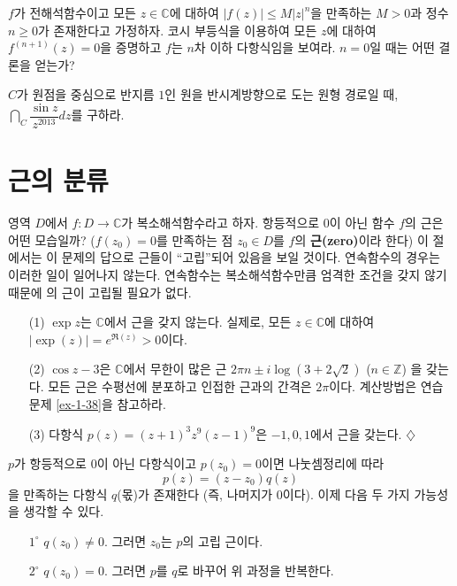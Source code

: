 \begin{salt_exercise} \label{ex-4-15}
$f$가 전해석함수이고 모든 $z\in\mathbb C$에 대하여
$|f(z)| \le M|z|^n$을 만족하는  $M>0$과 정수 $n\ge0$가 존재한다고 가정하자.
코시 부등식을 이용하여 모든 $z$에 대하여 $f^{(n+1)}(z) = 0$을 증명하고
$f$는 $n$차 이하 다항식임을 보여라. $n=0$일 때는 어떤 결론을 얻는가?
\end{salt_exercise}

\begin{salt_exercise} \label{ex-4-16}
$C$가 원점을 중심으로 반지름 $1$인 원을 반시계방향으로 도는 원형 경로일 때,
$\dint_C \dfrac{\sin z}{z^{2013}}dz$를 구하라.
\end{salt_exercise}

\section{근의 분류}

영역 $D$에서  $f: D\to \mathbb C$가 복소해석함수라고 하자.
항등적으로 $0$이 아닌 함수 $f$의 근은 어떤 모습일까?
($f(z_0)=0$를 만족하는 점 $z_0\in D$를 $f$의 {\bf 근(zero)}이라 한다)
이 절에서는 이 문제의 답으로 근들이 ``고립''되어 있음을 보일 것이다.
연속함수의 경우는 이러한 일이 일어나지 않는다. 
연속함수는 복소해석함수만큼 엄격한 조건을 갖지 않기 때문에
의 근이 고립될 필요가 없다.

\begin{saltexample}[label=example-4-5]{}{}
\begin{itemize}
\item[(1)] $\exp z$는 $\mathbb C$에서 근을 갖지 않는다.
실제로, 모든 $z\in \mathbb C$에 대하여 $|\exp(z)| = e^{\Re(z)} >0$이다.
\item[(2)] $\cos z - 3$은 $\mathbb C$에서 무한이 많은 근 
$2\pi n \pm i \log(3+2\sqrt{2})$ ($n\in\mathbb Z$)
을 갖는다.
모든 근은 수평선에 분포하고 인접한 근과의 간격은 $2\pi$이다.
계산방법은 연습문제 \ref{ex-1-38}을 참고하라.
\item[(3)] 다항식 $p(z) = (z+1)^3z^9(z-1)^9$은 $-1, 0, 1$에서 근을 갖는다. 
\hfill $\diamondsuit$
\end{itemize}
\end{saltexample}

$p$가 항등적으로 $0$이 아닌 다항식이고 $p(z_0)=0$이면
나눗셈정리에 따라 
\[
p(z) = (z-z_0) q(z)
\]
을 만족하는 다항식 $q$(몫)가 존재한다
(즉, 나머지가 $0$이다). 
이제 다음 두 가지  가능성을 생각할 수 있다.
\begin{itemize}
\item[$1^\circ$] $q(z_0) \ne0$. 그러면 $z_0$는 $p$의 고립 근이다.
\item[$2^\circ$] $q(z_0) =0$. 그러면 $p$를 $q$로 바꾸어 위 과정을 반복한다.
\end{itemize}

